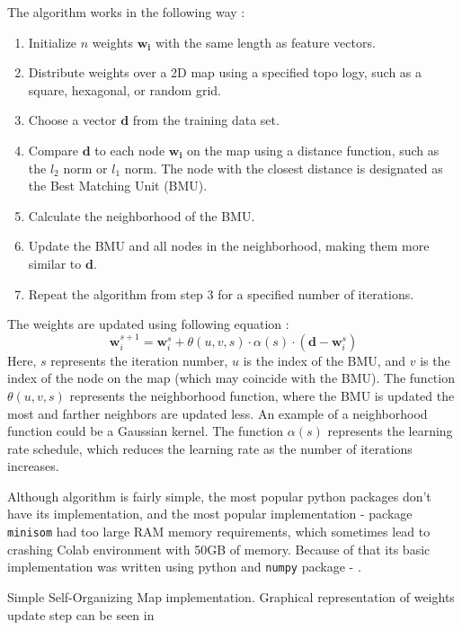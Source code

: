 The algorithm works in the following way \cite{somTutorial}: 
\begin{enumerate}
    \item Initialize $n$ weights $\mathbf{w_i}$ with the same length as feature vectors.
    \item Distribute weights over a 2D map using a specified topo logy, such as a square, hexagonal, or random grid.
    \item Choose a vector $\mathbf{d}$ from the training data set.
    \item Compare $\mathbf{d}$ to each node $\mathbf{w_i}$ on the map using a distance function, such as the $l_2$ norm or $l_1$ norm. The node with the closest distance is designated as the Best Matching Unit (BMU).
    \item Calculate the neighborhood of the BMU.
    \item Update the BMU and all nodes in the neighborhood, making them more similar to $\mathbf{d}$.
    \item Repeat the algorithm from step 3 for a specified number of iterations.
\end{enumerate}

The weights are updated using following equation \cite{somWikipedia}:
\[\mathbf{w}_i^{s+1} = \mathbf{w}_i^s + \theta(u, v, s) \cdot \alpha(s) \cdot (\mathbf{d} - \mathbf{w}_i^s)\]  
Here, $s$ represents the iteration number, $u$ is the index of the BMU, and $v$ is the index of the node on the map (which may coincide with the BMU). 
The function $\theta(u, v, s)$ represents the neighborhood function, where the BMU is updated the most and farther neighbors are updated less. 
An example of a neighborhood function could be a Gaussian kernel. 
The function $\alpha(s)$ represents the learning rate schedule, which reduces the learning rate as the number of iterations increases.

Although algorithm is fairly simple, the most popular python packages don't have its implementation, and the most popular implementation - package \texttt{minisom} had too large RAM memory requirements, which sometimes lead to crashing Colab environment with 50GB of memory.
Because of that its basic implementation was written using python and \texttt{numpy} package - . 

\newenvironment{longlistingB}{\captionsetup{type=listing, width=0.8\textwidth}}{}

\begin{longlistingB}
    \caption{Simple Self-Organizing Map implementation. Graphical representation of weights update step can be seen in }
    \label{lst:som}
\end{longlistingB}
\vspace{12pt}

